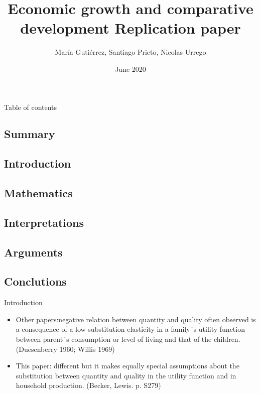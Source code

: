 \documentclass{beamer}
\title{Economic growth and comparative development Replication paper}
\author{María Gutiérrez, Santiago Prieto, Nicolas Urrego}
\date{June 2020}
\begin{document}
\maketitle


\begin{frame}
\tableofcontents[pausesections]
\alert{Table of contents}
\subsection{Summary}
\subsection{Introduction}
\subsection{Mathematics}
\subsection{Interpretations}
\subsection{Arguments} 
\subsection{Conclutions}
\end{frame}



\begin{frame}{Introduction}
\begin{itemize}
\item \alert{Other papers}:negative relation between quantity and quality often observed is a consequence of a low substitution elasticity in a family´s utility function between parent´s consumption or level of living and that of the children. (Duesenberry 1960; Willis 1969)


\item \alert{This paper}: different but it makes equally special assumptions about the substitution between \alert{quantity} and \alert{quality} in the utility function and in household production. (Becker, Lewis. p. S279)
\end{itemize}
\end{frame}
\end{document}
